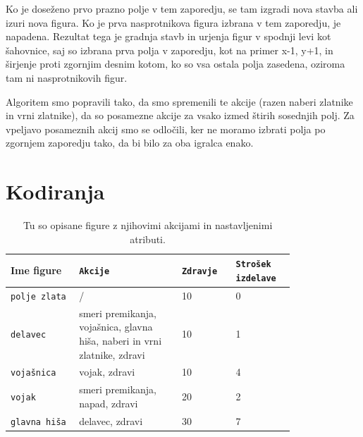 \documentclass[a4paper, 12pt]{book}
\begin{document}
Ko je doseženo prvo prazno polje v tem zaporedju, se tam izgradi nova stavba ali izuri nova figura.
Ko je prva nasprotnikova figura izbrana v tem zaporedju, je napadena.
Rezultat tega je gradnja stavb in urjenja figur v spodnji levi kot šahovnice, saj so izbrana prva polja v zaporedju, kot na primer x-1, y+1, in širjenje proti zgornjim desnim kotom, ko so vsa ostala polja zasedena, oziroma tam ni nasprotnikovih figur.

Algoritem smo popravili tako, da smo spremenili te akcije (razen naberi zlatnike in vrni zlatnike), da so posamezne akcije za vsako izmed štirih sosednjih polj.
Za vpeljavo posameznih akcij smo se odločili, ker ne moramo izbrati polja po zgornjem zaporedju tako, da bi bilo za oba igralca enako.

\section{Kodiranja}
\label{kodiranja}
\begin{table}

	\begin{center}
		
	\begin{tabular}{p{0.2\linewidth}|p{0.3\linewidth}|p{0.15\linewidth}|p{0.15\linewidth}}
		Ime figure          & {\tt Akcije}                                                              & {\tt Zdravje} & {\tt Strošek izdelave} \\ \hline
		{\tt polje zlata}   & /                                                                         & 10            & 0 \\
		{\tt delavec}       & smeri premikanja, vojašnica, glavna hiša, naberi in vrni zlatnike, zdravi & 10            & 1 \\
		{\tt vojašnica}     & vojak, zdravi                                                             & 10            & 4 \\
		{\tt vojak}         & smeri premikanja, napad, zdravi                                           & 20            & 2 \\
		{\tt glavna hiša}   & delavec, zdravi                                                           & 30            & 7 \\
	\end{tabular}
	\end{center}
	\caption{Tu so opisane figure z njihovimi akcijami in nastavljenimi atributi.}
	\label{tabelfigures}
\end{table}
\end{document}
